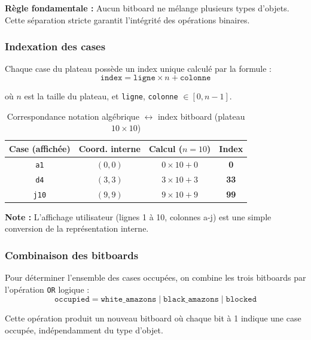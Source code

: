 \documentclass[a4paper]{article}
\begin{document}
\textbf{Règle fondamentale :} Aucun bitboard ne mélange plusieurs types d'objets. Cette séparation stricte garantit l'intégrité des opérations binaires.

\subsubsection{Indexation des cases}

Chaque case du plateau possède un index unique calculé par la formule :
\[ \texttt{index} = \texttt{ligne} \times n + \texttt{colonne} \]

où $n$ est la taille du plateau, et \texttt{ligne}, \texttt{colonne} $\in [0, n-1]$.

\begin{table}[H]
\centering
\begin{tabular}{cccc}
\toprule
\textbf{Case (affichée)} & \textbf{Coord. interne} & \textbf{Calcul ($n=10$)} & \textbf{Index} \\
\midrule
\texttt{a1} & $(0, 0)$ & $0 \times 10 + 0$ & \textbf{0} \\
\texttt{d4} & $(3, 3)$ & $3 \times 10 + 3$ & \textbf{33} \\
\texttt{j10} & $(9, 9)$ & $9 \times 10 + 9$ & \textbf{99} \\
\bottomrule
\end{tabular}
\caption{Correspondance notation algébrique $\leftrightarrow$ index bitboard (plateau $10 \times 10$)}
\end{table}

\textbf{Note :} L'affichage utilisateur (lignes 1 à 10, colonnes a-j) est une simple conversion de la représentation interne.

\subsubsection{Combinaison des bitboards}

Pour déterminer l'ensemble des cases occupées, on combine les trois bitboards par l'opération \texttt{OR} logique :
\[ \texttt{occupied} = \texttt{white\_amazons} \mid \texttt{black\_amazons} \mid \texttt{blocked} \]

Cette opération produit un nouveau bitboard où chaque bit à 1 indique une case occupée, indépendamment du type d'objet.
\end{document}
